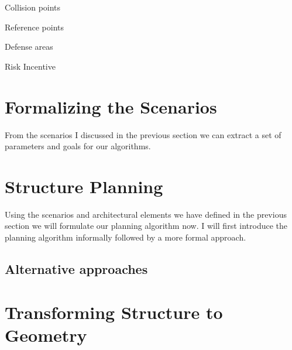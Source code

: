 Collision points

Reference points
	
Defense areas

Risk Incentive
\section{Formalizing the Scenarios}

From the scenarios I discussed in the previous section we can extract a set of parameters and goals for our algorithms.
 
\section{Structure Planning}
\label{sec:PlanningAlgorithm} 
  
 Using the scenarios and architectural elements we have defined in the previous section we will formulate our planning algorithm now.
 I will first introduce the planning algorithm informally followed by a more formal approach.
      
 
 	 
 


 \subsection{Alternative approaches}
 
 
 \section{Transforming Structure to Geometry}
 
